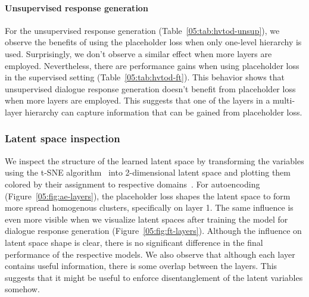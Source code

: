 \paragraph{Unsupervised response generation}
For the unsupervised response generation (Table~\ref{05:tab:hvtod-unsup}), we observe the benefits of using the placeholder loss when only one-level hierarchy is used.
Surprisingly, we don't observe a similar effect when more layers are employed.
Nevertheless, there are performance gains when using placeholder loss in the supervised setting (Table~\ref{05:tab:hvtod-ft}).
This behavior shows that unsupervised dialogue response generation doesn't benefit from placeholder loss when more layers are employed.
This suggests that one of the layers in a multi-layer hierarchy can capture information that can be gained from placeholder loss.

\subsubsection{Latent space inspection}
We inspect the structure of the learned latent space by transforming the variables using the t-SNE algorithm~\cite{van2008visualizing} into 2-dimensional latent space and plotting them colored by their assignment to respective domains~\cite{lubis-etal-2022-dialogue}.
For autoencoding (Figure~\ref{05:fig:ae-layers}), the placeholder loss shapes the latent space to form more spread homogenous clusters, specifically on layer 1.
The same influence is even more visible when we visualize latent spaces after training the model for dialogue response generation (Figure~\ref{05:fig:ft-layers}).
Although the influence on latent space shape is clear, there is no significant difference in the final performance of the respective models.
We also observe that although each layer contains useful information, there is some overlap between the layers.
This suggests that it might be useful to enforce disentanglement of the latent variables somehow.

